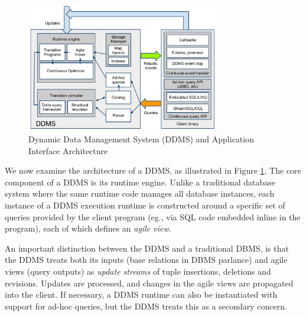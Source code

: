 
\begin{figure}
\begin{center}
\includegraphics[width=3.3in]{graphics/CIDRarch.pdf}
\end{center}
\vspace*{-0.2in}
\caption{Dynamic Data Management System (DDMS) and Application Interface
Architecture}
\label{fig:ddmsarch}
\vspace*{-0.2in}
\end{figure}

We now examine the architecture of a DDMS, as illustrated in Figure \ref{fig:ddmsarch}.  The core component of a DDMS is its runtime engine.  Unlike a traditional database system where the same runtime code manages all database instances, each instance of a DDMS execution runtime is constructed around a specific set of queries provided by the client program (eg., via SQL code embedded inline in the program), each of which defines an \textit{agile view}.

An important distinction between the DDMS and a traditional DBMS, is that the DDMS treats both its inputs (base relations in DBMS parlance) and agile views (query outputs) as \textit{update streams} of tuple insertions, deletions and revisions.  Updates are processed, and changes in the agile views are propagated into the client.  If necessary, a DDMS runtime can also be instantiated with support for ad-hoc queries, but the DDMS treats this as a secondary concern.

